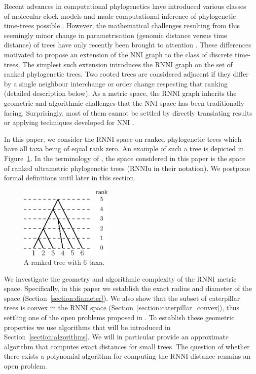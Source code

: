 \documentclass{amsart}
\newcommand{\nni}{\mathrm{NNI}}
\newcommand{\rnni}{\mathrm{RNNI}}
\newcommand{\rnniu}{\mathrm{RNNIu}}
\begin{document}
Recent advances in computational phylogenetics have introduced various classes of molecular clock models \autocite{Yoder2000-ks,Drummond2006-nl,Drummond2010-yf} and made computational inference of phylogenetic time-trees possible \autocite{Ronquist2003-eq, Bouckaert2018-yr, Hadfield2018-xp}.
However, the mathematical challenges resulting from this seemingly minor change in parametrisation (genomic distance versus time distance) of trees have only recently been brought to attention \autocite{Gavryushkin2016-uu}.
These differences motivated \textcite{Gavryushkin2018-ol} to propose an extension of the $\nni$ graph to the class of discrete time-trees.
The simplest such extension introduces the $\rnni$ graph on the set of ranked phylogenetic trees.
Two rooted trees are considered adjacent if they differ by a single neighbour interchange or order change respecting that ranking (detailed description below).
As a metric space, the $\rnni$ graph inherits the geometric and algorithmic challenges that the $\nni$ space has been traditionally facing.
Surprisingly, most of them cannot be settled by directly translating results or applying techniques developed for $\nni$ \autocite{Gavryushkin2018-ol}.

In this paper, we consider the $\rnni$ space on ranked phylogenetic trees which have all taxa being of equal rank zero.
An example of such a tree is depicted in Figure~\ref{fig:ranked_tree}.
In the terminology of \autocite{Gavryushkin2018-ol}, the space considered in this paper is the space of ranked ultrametric phylogenetic trees ($\rnniu$ in their notation).
We postpone formal definitions until later in this section.

\begin{figure}[H]
\centering
\includegraphics[width=0.4\textwidth]{ranked_tree}
\vspace{12pt}
\caption{A ranked tree with $6$ taxa.}
\label{fig:ranked_tree}
\end{figure}

We investigate the geometry and algorithmic complexity of the $\rnni$ metric space.
Specifically, in this paper we establish the exact radius and diameter of the space (Section~\ref{section:diameter}).
We also show that the subset of caterpillar trees is convex in the $\rnni$ space (Section~\ref{section:caterpillar_convex}), thus settling one of the open problems proposed in \autocite{Gavryushkin2018-ol}.
To establish these geometric properties we use algorithms that will be introduced in Section~\ref{section:algorithms}.
We will in particular provide an approximate algorithm that computes exact distances for small trees.
The question of whether there exists a polynomial algorithm for computing the $\rnni$ distance remains an open problem.
\end{document}
